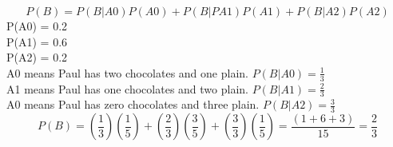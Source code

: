 \documentclass[12pt]{article}
\begin{document}
\begin{enumerate}
\begin{enumerate}
  \[ P(B) = P(B | A0)P(A0) + P(B | PA1)P(A1) + P(B | A2)P(A2) \] 
  P(A0) = 0.2 \\
  P(A1) = 0.6 \\
  P(A2) = 0.2 \\
  A0 means Paul has two chocolates and one plain. $P(B | A0) = \frac{1}{3}$ \\
  A1 means Paul has one chocolates and two plain. $P(B | A1) = \frac{2}{3}$ \\
  A0 means Paul has zero chocolates and three plain. $P(B | A2) = \frac{3}{3}$ \\
  \[ P(B) = (\frac{1}{3})(\frac{1}{5}) + (\frac{2}{3})(\frac{3}{5}) + (\frac{3}{3})(\frac{1}{5}) = \frac{(1 + 6 + 3)}{15} = \frac{2}{3} \] 
\end{enumerate}


\end{enumerate}
\end{document}
